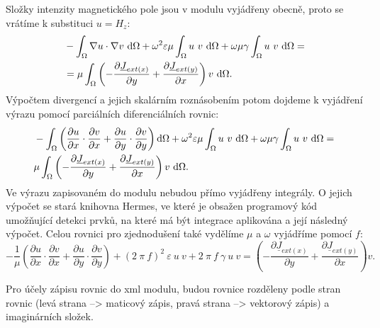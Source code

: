 \documentclass[12pt,a4paper,oneside]{article}
\numberwithin{equation}{section} %
\numberwithin{figure}{section} %
\numberwithin{table}{section} %
\newcommand{\faz}[1]{{\underline{#1}}} %
\begin{document}
Složky intenzity magnetického pole jsou v modulu vyjádřeny obecně, proto se vrátíme k substituci $u = H_z$:
\begin{equation}
\begin{split}
&- \int _{\Omega} \nabla u \cdot \nabla v ~ \ud \Omega + \omega ^2 \varepsilon \mu \int _{\Omega} u ~ v ~ \ud \Omega + \omega \mu \gamma \int _{\Omega} u ~ v ~ \ud \Omega = 
\\
&= \mu \int _{\Omega} \left( - \frac{\partial \faz{J} _{ext(x)}}{\partial y} + \frac{\partial \faz{J} _{ext(y)}}{\partial x} \right) v ~ \ud \Omega .
\end{split}
\end{equation}
Výpočtem divergencí a jejich skalárním roznásobením potom dojdeme k vyjádření výrazu pomocí parciálních diferenciálních rovnic:
\begin{equation}
\begin{split}
&- \int _{\Omega} \left( \frac{\partial u}{\partial x} \cdot \frac{\partial v}{\partial x} + \frac{\partial u}{\partial y} \cdot \frac{\partial v}{\partial y} \right) \ud \Omega + \omega ^2 \varepsilon \mu \int _{\Omega} u ~ v ~ \ud \Omega + \omega \mu \gamma \int _{\Omega} u ~ v ~ \ud \Omega = 
\\
&\mu \int _{\Omega} \left( - \frac{\partial \faz{J} _{ext(x)}}{\partial y} + \frac{\partial \faz{J} _{ext(y)}}{\partial x} \right) v ~ \ud \Omega .
\end{split}
\end{equation}
Ve výrazu zapisovaném do modulu nebudou přímo vyjádřeny integrály. O jejich výpočet se stará knihovna Hermes, ve které je obsažen programový kód umožňující detekci prvků, na které má být integrace aplikována a její následný výpočet. Celou rovnici pro zjednodušení také vydělíme $\mu$ a $\omega$ vyjádříme pomocí $f$:
\begin{equation}
- \frac{1}{\mu} \left( \frac{\partial u}{\partial x} \cdot \frac{\partial v}{\partial x} + \frac{\partial u}{\partial y} \cdot \frac{\partial v}{\partial y} \right) + (2 ~ \pi ~ f) ^2 ~ \varepsilon ~ u ~ v + 2 ~ \pi ~ f ~ \gamma ~ u ~ v = \left( - \frac{\partial \faz{J} _{ext(x)}}{\partial y} + \frac{\partial \faz{J} _{ext(y)}}{\partial x} \right) v .
\end{equation}

Pro účely zápisu rovnic do xml modulu, budou rovnice rozděleny podle stran rovnic (levá strana --> maticový zápis, pravá strana --> vektorový zápis) a imaginárních složek.
\end{document}
